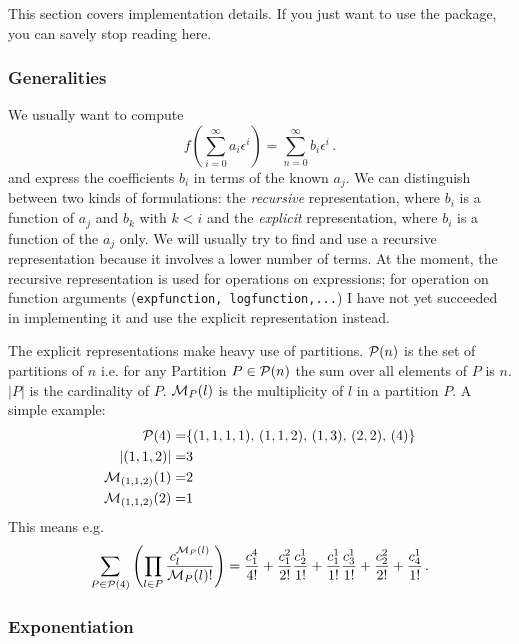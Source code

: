 \documentclass{article}
\begin{document}
This section covers implementation details. If you just want to use the
package, you can savely stop reading here.

\subsubsection{Generalities}
\label{sec:impl_general}


 We usually want to compute
\begin{equation}
  \label{eq:def}
  f\left(\sum_{i=0}^{\infty}a_i \epsilon^i\right)=\sum_{n=0}^\infty b_i \epsilon^i\,.
\end{equation}
and express the coefficients $b_i$ in terms of the known $a_j$. We can
distinguish between two kinds of formulations: the {\it recursive} representation,
where $b_i$ is a function of $a_j$ and $b_k$ with $k < i$ and the {\it
  explicit} representation, where $b_i$ is a function of the $a_j$ only.
We will usually try to find and use a recursive representation because
it involves a lower number of terms. At the moment, the recursive
representation is used for operations on expressions; for operation
on function arguments ({\tt expfunction, logfunction,...}) I have not yet succeeded in
implementing it and use the explicit representation instead.

The explicit representations make heavy use of partitions.
${\cal P}(n)$ is the set of partitions of $n$ i.e. for any
Partition $P \in {\cal P}(n)$ the sum over all elements of $P$ is
$n$. $|P|$ is the cardinality of $P$.
${\cal M}_P(l)$ is the multiplicity of $l$ in a partition $P$. A simple
example:
\begin{align*}
  {\cal P}(4)=&\{(1,1,1,1),\,(1,1,2),\,(1,3),\,(2,2),\,(4)\}\\
  |(1,1,2)|=&3\\
  {\cal M}_{(1,1,2)}(1)=&2\\
  {\cal M}_{(1,1,2)}(2)=&1\\
\end{align*}
This means e.g. 
\begin{equation}
  \label{eq:exp_ex}
\sum_{P \in {\cal P}(4)} \left(\prod_{l \in P} \frac{c^{{\cal M}_P(l)}_l}{{\cal M}_P(l)!} \right)=
  \frac{c_1^4}{4!}+\frac{c_1^2}{2!}\frac{c_2^1}{1!}+\frac{c_1^1}{1!}\frac{c_3^1}{1!}+\frac{c_2^2}{2!}+\frac{c_4^1}{1!}\,.
\end{equation}


\subsubsection{Exponentiation}
\label{sec:impl_exp}
\end{document}
